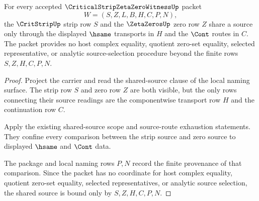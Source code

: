 \begin{theorem}
\label{thm:critical-strip-zeta-zero-shared-source-binding}
For every accepted $\CriticalStripZetaZeroWitnessUp$ packet
$$
W=(S,Z,L,B,H,C,P,N),
$$
the $\CritStripUp$ strip row $S$ and the $\ZetaZerosUp$ zero row $Z$ share a source only through the displayed $\hsame$ transports in $H$ and the $\Cont$ routes in $C$. The packet provides no host complex equality, quotient zero-set equality, selected representative, or analytic source-selection procedure beyond the finite rows $S,Z,H,C,P,N$.
\end{theorem}
\begin{proof}
Project the carrier and read the shared-source clause of the local naming surface. The strip row $S$ and zero row $Z$ are both visible, but the only rows connecting their source readings are the componentwise transport row $H$ and the continuation row $C$.

Apply the existing shared-source scope and source-route exhaustion statements. They confine every comparison between the strip source and zero source to displayed $\hsame$ and $\Cont$ data.

The package and local naming rows $P,N$ record the finite provenance of that comparison. Since the packet has no coordinate for host complex equality, quotient zero-set equality, selected representatives, or analytic source selection, the shared source is bound only by $S,Z,H,C,P,N$.
\end{proof}

